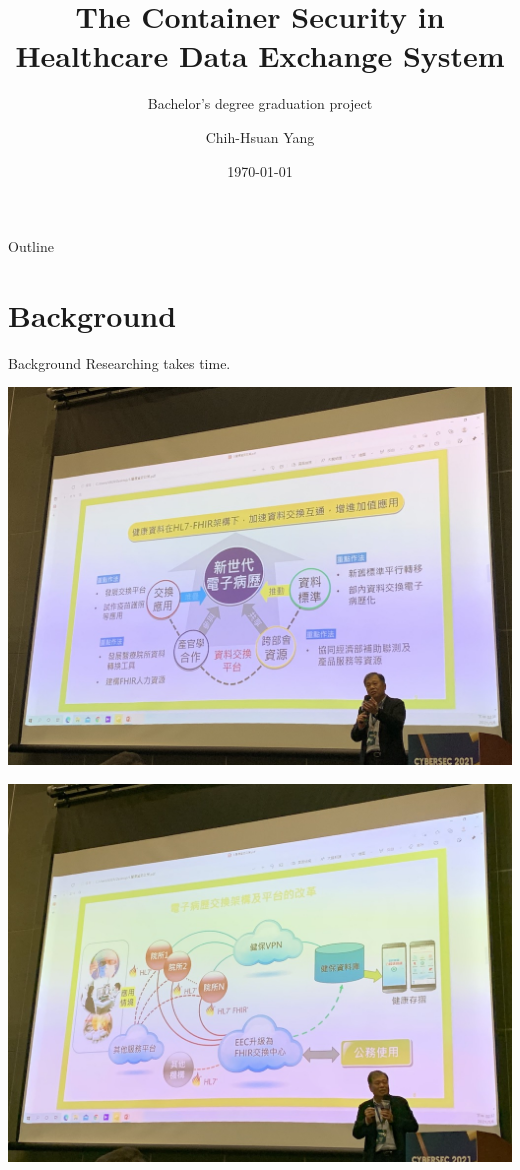 \documentclass{beamer}
\title{The Container Security in Healthcare Data Exchange System}
\subtitle{Bachelor's degree graduation project}
\author{Chih-Hsuan Yang}
\institute{National Sun Yat-sen University\\
Advisor: Chun-I Fan
}
\date{\today}
\begin{document}
\begin{CJK*}{UTF8}{bsmi}

    \begin{frame}
        \titlepage
    \end{frame}

    \begin{frame}{Outline}
        \begin{multicols}{2}
            \tableofcontents
        \end{multicols}
    \end{frame}

    \section{Background}
    \begin{frame}{Background}
        \centering \Huge
        Researching takes time.
    \end{frame}

    \begin{frame}
        \includegraphics[width=\textwidth]{IMG_6551.jpg}
    \end{frame}

    \begin{frame}
        \includegraphics[width=\textwidth]{IMG_6549.jpg}
    \end{frame}


\end{CJK*}
\end{document}
